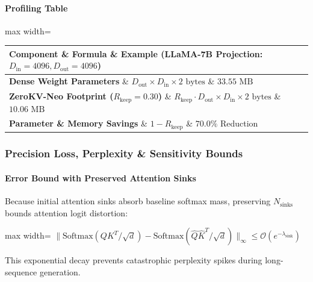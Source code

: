 \paragraph{Profiling Table}

\begin{center}
\begin{adjustbox}{max width=\columnwidth}
\renewcommand{\arraystretch}{1.2}
\begin{tabular}{lll}
\toprule
Component \& Formula \& Example (LLaMA-7B Projection: $D_{\text{in}}=4096, D_{\text{out}}=4096$) \\
\midrule
\textbf{Dense Weight Parameters} \& $D_{\text{out}} \times D_{\text{in}} \times 2 \text{ bytes}$ \& $33.55 \text{ MB}$ \\
\textbf{ZeroKV-Neo Footprint ($R_{\text{keep}}=0.30$)} \& $R_{\text{keep}} \cdot D_{\text{out}} \times D_{\text{in}} \times 2 \text{ bytes}$ \& $10.06 \text{ MB}$ \\
\textbf{Parameter \& Memory Savings} \& $1 - R_{\text{keep}}$ \& $\mathbf{70.0\%}$ Reduction \\

\bottomrule
\end{tabular}
\end{adjustbox}
\end{center}

\subsubsection*{Precision Loss, Perplexity \& Sensitivity Bounds}

\paragraph{Error Bound with Preserved Attention Sinks}

Because initial attention sinks absorb baseline softmax mass, preserving $N_{\text{sinks}}$ bounds attention logit distortion:

\begin{center}
\begin{adjustbox}{max width=\columnwidth}
$\displaystyle
\| \text{Softmax}(Q K^T / \sqrt{d}) - \text{Softmax}(\widehat{Q} \widehat{K}^T / \sqrt{d}) \|_\infty \le \mathcal{O}\left( e^{-\lambda_{\text{sink}}} \right)
$
\end{adjustbox}
\end{center}

This exponential decay prevents catastrophic perplexity spikes during long-sequence generation.


